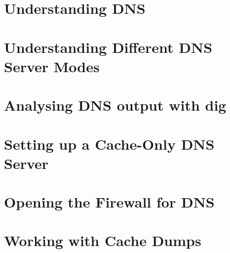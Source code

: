 
\usepackage{minted}
\usepackage{booktabs}


	
	
	\section{Understanding DNS}
	
	
	\section{Understanding Different DNS Server Modes}
	\section{Analysing DNS output with dig}
	\section{Setting up a Cache-Only DNS Server}
	\section{Opening the Firewall for DNS}
	\section{Working with Cache Dumps}


